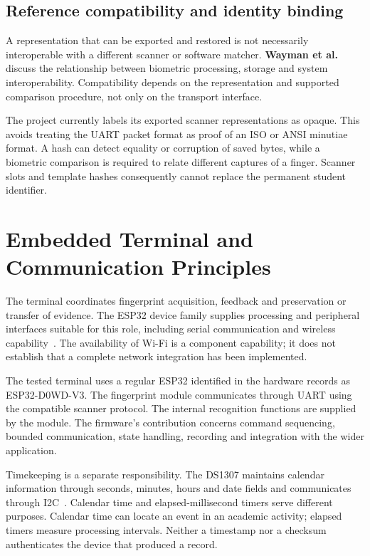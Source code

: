\subsection{Reference compatibility and identity binding}\label{sec:2-5-3}

A representation that can be exported and restored is not necessarily interoperable with a different scanner or software matcher. \textbf{Wayman et al.}~\cite{wayman2005} discuss the relationship between biometric processing, storage and system interoperability. Compatibility depends on the representation and supported comparison procedure, not only on the transport interface.

The project currently labels its exported scanner representations as opaque. This avoids treating the UART packet format as proof of an ISO or ANSI minutiae format. A hash can detect equality or corruption of saved bytes, while a biometric comparison is required to relate different captures of a finger. Scanner slots and template hashes consequently cannot replace the permanent student identifier.

\section{Embedded Terminal and Communication Principles}\label{sec:2-6}

The terminal coordinates fingerprint acquisition, feedback and preservation or transfer of evidence. The ESP32 device family supplies processing and peripheral interfaces suitable for this role, including serial communication and wireless capability~\cite{esp32}. The availability of Wi-Fi is a component capability; it does not establish that a complete network integration has been implemented.

The tested terminal uses a regular ESP32 identified in the hardware records as ESP32-D0WD-V3. The fingerprint module communicates through UART using the compatible scanner protocol. The internal recognition functions are supplied by the module. The firmware's contribution concerns command sequencing, bounded communication, state handling, recording and integration with the wider application.

Timekeeping is a separate responsibility. The DS1307 maintains calendar information through seconds, minutes, hours and date fields and communicates through I2C~\cite{analogds1307}. Calendar time and elapsed-millisecond timers serve different purposes. Calendar time can locate an event in an academic activity; elapsed timers measure processing intervals. Neither a timestamp nor a checksum authenticates the device that produced a record.

